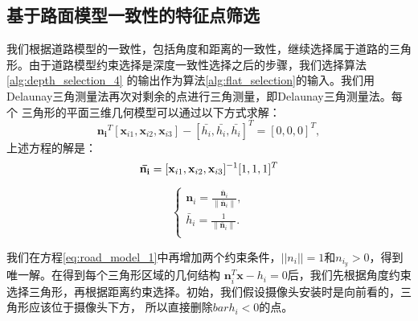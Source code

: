 \subsection{基于路面模型一致性的特征点筛选}
\label{sec:RoadNormal}
我们根据道路模型的一致性，包括角度和距离的一致性，继续选择属于道路的三角形。由于道路模型约束选择是深度一致性选择之后的步骤，我们选择算法\ref{alg:depth_selection_4}
的输出作为算法\ref{alg:flat_selection}的输入。我们用Delaunay三角测量法再次对剩余的点进行三角测量，即Delaunay三角测量法\cite{Shewchuk1996Triangle}。每个
三角形的平面三维几何模型可以通过以下方式求解：
\begin{equation}
    \mathbf{n_i}^T[\mathbf{x}_{i1},\mathbf{x}_{i2},\mathbf{x}_{i3}] -[\bar{h_i},\bar{h_i},\bar{h_i}]^{T}=[0,0,0]^{T},
    \label{eq:road_model_1}
\end{equation}
上述方程的解是：
\begin{equation}
    \mathbf{\bar{n_i}} = [\mathbf{x}_{i1}\\,\mathbf{x}_{i2}\\,\mathbf{x}_{i3}]^{-1}[1,1,1]^{T}
    \label{eq:road_model_2}    
\end{equation}

\begin{equation}
   \begin{cases}
       \mathbf{n}_{i} =\frac{\mathbf{\bar{n}}_{i}}{\|\mathbf{\bar{n}}_{i}\|},\\
       \bar{h}_{i} =\frac{1}{\|\mathbf{\bar{n}}_{i}\|}.\\
   \end{cases}
   \label{eq:road_model_3}
\end{equation}

我们在方程\eqref{eq:road_model_1}中再增加两个约束条件，$||n_{i}||=1$和$n_{i_{y}}>0$，得到唯一解。在得到每个三角形区域的几何结构
$\mathbf{n}_{i}^T\mathbf{x}-h_{i}=0$后，我们先根据角度约束选择三角形，再根据距离约束选择。初始，我们假设摄像头安装时是向前看的，三角形应该位于摄像头下方，
所以直接删除$bar{h}_i<0$的点。


